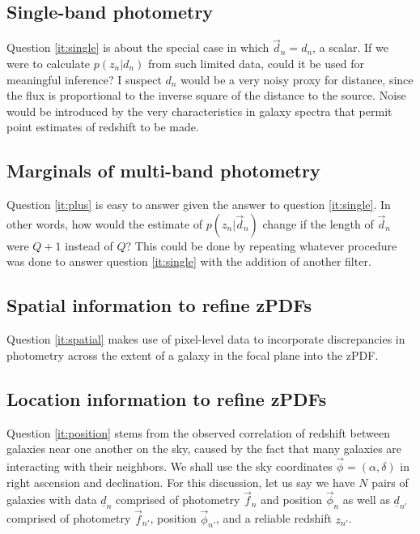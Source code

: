 \documentclass[12pt, onecolumn]{emulateapj}
\newcommand{\textul}{\underline}
\begin{document}
\subsection{Single-band photometry}

Question \ref{it:single} is about the special case in which $\vec{d}_{n}=d_{n}$, a scalar.  If we were to calculate $p(z_{n}|d_{n})$ from such limited data, could it be used for meaningful inference?  I suspect $d_{n}$ would be a very noisy proxy for distance, since the flux is proportional to the inverse square of the distance to the source.  Noise would be introduced by the very characteristics in galaxy spectra that permit point estimates of redshift to be made.

\subsection{Marginals of multi-band photometry}

Question \ref{it:plus} is easy to answer given the answer to question \ref{it:single}.  In other words, how would the estimate of $p(z_{n}|\vec{d}_{n})$ change if the length of $\vec{d}_{n}$ were $Q+1$ instead of $Q$?  This could be done by repeating whatever procedure was done to answer question \ref{it:single} with the addition of another filter.

\subsection{Spatial information to refine zPDFs}

Question \ref{it:spatial} makes use of pixel-level data to incorporate discrepancies in photometry across the extent of a galaxy in the focal plane into the zPDF.

\subsection{Location information to refine zPDFs}

Question \ref{it:position} stems from the observed correlation of redshift between galaxies near one another on the sky, caused by the fact that many galaxies are interacting with their neighbors.  We shall use the sky coordinates $\vec{\phi}=(\alpha,\delta)$ in right ascension and declination.  For this discussion, let us say we have $N$ pairs of galaxies with data $\textul{d}_{n}$ comprised of photometry $\vec{f}_{n}$ and position $\vec{\phi}_{n}$ as well as $\textul{d}_{n'}$ comprised of photometry $\vec{f}_{n'}$, position $\vec{\phi}_{n'}$, and a reliable redshift $z_{n'}$.  
\end{document}
